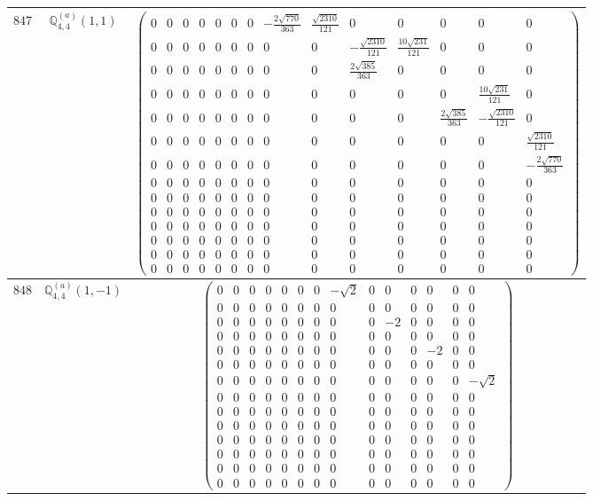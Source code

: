 \documentclass[fleqn,8pt,landscape]{jsarticle}
\begin{document}
\begin{center}
\begin{longtable}{ccc}
$ 847 $ & $ \mathbb{Q}_{4,4}^{(a)}(1,1) $ & $ \begin{pmatrix} 0 & 0 & 0 & 0 & 0 & 0 & 0 & - \frac{2 \sqrt{770}}{363} & \frac{\sqrt{2310}}{121} & 0 & 0 & 0 & 0 & 0 \\ 0 & 0 & 0 & 0 & 0 & 0 & 0 & 0 & 0 & - \frac{\sqrt{2310}}{121} & \frac{10 \sqrt{231}}{121} & 0 & 0 & 0 \\ 0 & 0 & 0 & 0 & 0 & 0 & 0 & 0 & 0 & \frac{2 \sqrt{385}}{363} & 0 & 0 & 0 & 0 \\ 0 & 0 & 0 & 0 & 0 & 0 & 0 & 0 & 0 & 0 & 0 & 0 & \frac{10 \sqrt{231}}{121} & 0 \\ 0 & 0 & 0 & 0 & 0 & 0 & 0 & 0 & 0 & 0 & 0 & \frac{2 \sqrt{385}}{363} & - \frac{\sqrt{2310}}{121} & 0 \\ 0 & 0 & 0 & 0 & 0 & 0 & 0 & 0 & 0 & 0 & 0 & 0 & 0 & \frac{\sqrt{2310}}{121} \\ 0 & 0 & 0 & 0 & 0 & 0 & 0 & 0 & 0 & 0 & 0 & 0 & 0 & - \frac{2 \sqrt{770}}{363} \\ 0 & 0 & 0 & 0 & 0 & 0 & 0 & 0 & 0 & 0 & 0 & 0 & 0 & 0 \\ 0 & 0 & 0 & 0 & 0 & 0 & 0 & 0 & 0 & 0 & 0 & 0 & 0 & 0 \\ 0 & 0 & 0 & 0 & 0 & 0 & 0 & 0 & 0 & 0 & 0 & 0 & 0 & 0 \\ 0 & 0 & 0 & 0 & 0 & 0 & 0 & 0 & 0 & 0 & 0 & 0 & 0 & 0 \\ 0 & 0 & 0 & 0 & 0 & 0 & 0 & 0 & 0 & 0 & 0 & 0 & 0 & 0 \\ 0 & 0 & 0 & 0 & 0 & 0 & 0 & 0 & 0 & 0 & 0 & 0 & 0 & 0 \\ 0 & 0 & 0 & 0 & 0 & 0 & 0 & 0 & 0 & 0 & 0 & 0 & 0 & 0 \end{pmatrix} $ \\ \hline
$ 848 $ & $ \mathbb{Q}_{4,4}^{(a)}(1,-1) $ & $ \begin{pmatrix} 0 & 0 & 0 & 0 & 0 & 0 & 0 & - \sqrt{2} & 0 & 0 & 0 & 0 & 0 & 0 \\ 0 & 0 & 0 & 0 & 0 & 0 & 0 & 0 & 0 & 0 & 0 & 0 & 0 & 0 \\ 0 & 0 & 0 & 0 & 0 & 0 & 0 & 0 & 0 & -2 & 0 & 0 & 0 & 0 \\ 0 & 0 & 0 & 0 & 0 & 0 & 0 & 0 & 0 & 0 & 0 & 0 & 0 & 0 \\ 0 & 0 & 0 & 0 & 0 & 0 & 0 & 0 & 0 & 0 & 0 & -2 & 0 & 0 \\ 0 & 0 & 0 & 0 & 0 & 0 & 0 & 0 & 0 & 0 & 0 & 0 & 0 & 0 \\ 0 & 0 & 0 & 0 & 0 & 0 & 0 & 0 & 0 & 0 & 0 & 0 & 0 & - \sqrt{2} \\ 0 & 0 & 0 & 0 & 0 & 0 & 0 & 0 & 0 & 0 & 0 & 0 & 0 & 0 \\ 0 & 0 & 0 & 0 & 0 & 0 & 0 & 0 & 0 & 0 & 0 & 0 & 0 & 0 \\ 0 & 0 & 0 & 0 & 0 & 0 & 0 & 0 & 0 & 0 & 0 & 0 & 0 & 0 \\ 0 & 0 & 0 & 0 & 0 & 0 & 0 & 0 & 0 & 0 & 0 & 0 & 0 & 0 \\ 0 & 0 & 0 & 0 & 0 & 0 & 0 & 0 & 0 & 0 & 0 & 0 & 0 & 0 \\ 0 & 0 & 0 & 0 & 0 & 0 & 0 & 0 & 0 & 0 & 0 & 0 & 0 & 0 \\ 0 & 0 & 0 & 0 & 0 & 0 & 0 & 0 & 0 & 0 & 0 & 0 & 0 & 0 \end{pmatrix} $ \\ \hline

\end{longtable}
\end{center}
\end{document}
